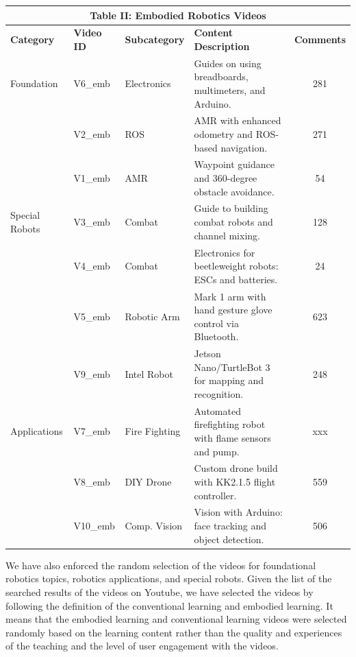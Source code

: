 \documentclass[12pt]{article}
\begin{document}
\begin{table}[!t]
    \begin{tabularx}{\textwidth}{l l p{2.2cm} X c} 
        \toprule
        \multicolumn{5}{c}{\textbf{Table II: Embodied Robotics Videos}} \\
        \midrule
        \textbf{Category} & \textbf{Video ID} & \textbf{Subcategory} & \textbf{Content Description} & \textbf{Comments} \\
        \midrule
        Foundation & V6\_emb & Electronics & Guides on using breadboards, multimeters, and Arduino. & 281 \\
        & V2\_emb & ROS & AMR with enhanced odometry and ROS-based navigation. & 271 \\
        & V1\_emb & AMR & Waypoint guidance and 360-degree obstacle avoidance. & 54 \\
        \addlinespace
        Special Robots & V3\_emb & Combat & Guide to building combat robots and channel mixing. & 128 \\
        & V4\_emb & Combat & Electronics for beetleweight robots: ESCs and batteries. & 24 \\
        & V5\_emb & Robotic Arm & Mark 1 arm with hand gesture glove control via Bluetooth. & 623 \\
        & V9\_emb & Intel Robot & Jetson Nano/TurtleBot 3 for mapping and recognition. & 248 \\
        \addlinespace
        Applications & V7\_emb & Fire Fighting & Automated firefighting robot with flame sensors and pump. & xxx \\
        & V8\_emb & DIY Drone & Custom drone build with KK2.1.5 flight controller. & 559 \\
        & V10\_emb & Comp. Vision & Vision with Arduino: face tracking and object detection. & 506 \\
        \bottomrule
    \end{tabularx}
\end{table}

  

We have also enforced the random selection of the videos for foundational robotics topics, robotics applications, and special robots. Given the list of the searched results of the videos on Youtube, we have selected the videos by following the definition of the conventional learning and embodied learning. It means that the embodied learning and conventional learning videos were selected randomly based on the learning content rather than the quality and experiences of the teaching and the level of user engagement with the videos.  %
\end{document}
